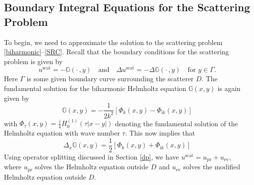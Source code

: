 \documentclass{article}
\numberwithin{equation}{section}
\begin{document}
{%
\subsection{Boundary Integral Equations for the Scattering Problem}
To begin, we need to approximate the solution to the scattering problem \eqref{biharmonic}--\eqref{SRC}. Recall that the boundary conditions for the scattering problem is given by 
$$u^{\text{scat}}=-\mathbb{G}( \cdot \, ,y) \quad \text{and} \quad  \Delta u^{\text{scat}}=-\Delta \mathbb{G}(\cdot \, ,y) \quad \text{for $y\in \Gamma$.}$$
Here $\Gamma$ is some given boundary curve surrounding the scatterer $D$. The fundamental solution for the biharmonic Helmholtz equation $\mathbb{G}(x ,y)$ is again given by 
$$\mathbb{G}(x,y) = -\frac{1}{2k^2}\left[\Phi_k(x,y)-\Phi_{\mathrm{i}k}(x,y)\right]$$
with $\Phi_\tau (x,y)=\frac{\mathrm{i}}{4}H^{(1)}_0(\tau|x - y|)$ denoting the fundamental solution of the Helmholtz equation with wave number $\tau$.
This now implies that 
$$\Delta_x \mathbb{G}(x,y) = \frac{1}{2}\left[\Phi_k(x,y)+\Phi_{\mathrm{i}k}(x,y)\right]$$
Using operator splitting discussed in Section \ref{dp}, we have $u^{\text{scat}}=u_{\text{pr}}+u_{\text{ev}}$, where $u_{\text{pr}}$ solves the Helmholtz equation outside $D$ and $u_{\text{ev}}$ solves the modified Helmholtz equation outside $D$. 


}
\end{document}
